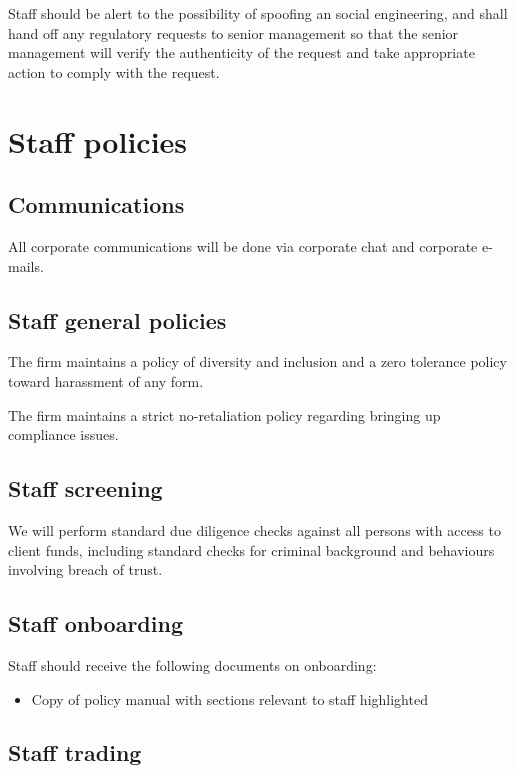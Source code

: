 Staff should be alert to the possibility of spoofing an social
engineering, and shall hand off any regulatory requests to senior
management so that the senior management will verify the authenticity
of the request and take appropriate action to comply with the request.

\section{Staff policies}

\subsection{Communications}
All corporate communications will be done via corporate chat and
corporate e-mails.

\subsection{Staff general policies}

The firm maintains a policy of diversity and inclusion and a zero
tolerance policy toward harassment of any form.

The firm maintains a strict no-retaliation policy regarding bringing up
compliance issues.

\subsection{Staff screening}
We will perform standard due diligence checks against all persons with
access to client funds, including standard checks for criminal
background and behaviours involving breach of trust.

\subsection{Staff onboarding}

Staff should receive the following documents on onboarding:

\begin{itemize}
  \item Copy of policy manual with sections relevant to staff
    highlighted
\end{itemize}

\subsection{Staff trading}


